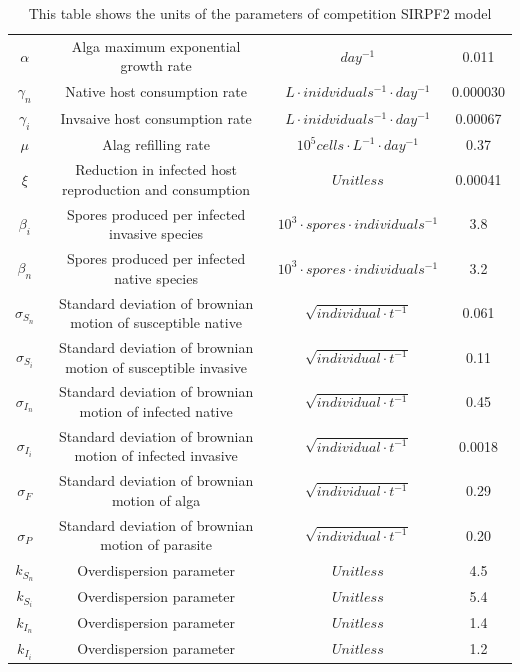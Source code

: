 \documentclass[12pt]{article}
\begin{document}
\begin{table}[H]
{\begin{tabular}{||c|c |c|c||}
$\alpha$ & Alga maximum exponential growth rate&$day ^{-1} $& 0.011 \\
$\gamma_n$ & Native host consumption rate&$L \cdot inidviduals^{-1} \cdot day ^{-1} $ & 0.000030\\
$\gamma_i$ & Invsaive host consumption rate&$L \cdot inidviduals^{-1} \cdot day ^{-1} $ & 0.00067\\
$\mu$ & Alag refilling rate&$10^5 cells \cdot L ^{-1} \cdot day^{-1}$ & 0.37\\
$\xi$ &Reduction in infected host reproduction and consumption& $Unitless$ & 0.00041\\
$\beta_i$ & Spores produced per infected invasive species&$10^3 \cdot spores \cdot individuals^{-1} $ & 3.8\\
$\beta_n$ & Spores produced per infected native species&$10^3 \cdot spores \cdot individuals^{-1} $ & 3.2\\
$\sigma_{S_n}$ & Standard deviation of brownian motion of susceptible native&$\sqrt{individual \cdot t^{-1}}$ & 0.061\\
$\sigma_{S_i}$ & Standard deviation of brownian motion of susceptible invasive &$\sqrt{individual \cdot t^{-1}}$ & 0.11\\
$\sigma_{I_n}$ & Standard deviation of brownian motion of infected native&$\sqrt{individual \cdot t^{-1}}$ & 0.45\\
$\sigma_{I_i}$ & Standard deviation of brownian motion of infected invasive&$\sqrt{individual \cdot t^{-1}}$ & 0.0018\\
$\sigma_{F}$ & Standard deviation of brownian motion of alga&$\sqrt{individual \cdot t^{-1}}$ & 0.29\\
$\sigma_{P}$ &Standard deviation of brownian motion of parasite &$\sqrt{individual \cdot t^{-1}}$ & 0.20\\
$k_{S_n}$ & Overdispersion parameter& $Unitless$ & 4.5\\
$k_{S_i}$ &Overdispersion parameter &$Unitless$ & 5.4\\
$k_{I_n}$ &Overdispersion parameter &$Unitless$ & 1.4\\
$k_{I_i}$ & Overdispersion parameter&$Unitless$ & 1.2\\[1ex]
 \hline
\end{tabular}}
\caption{This table shows the units of the parameters of competition SIRPF2 model}
\label{Table:1}
\end{table}
\end{document}
